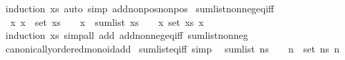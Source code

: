 \begin{isabellebody}
%
\isadelimproof
%
\endisadelimproof
%
\isatagproof
{}\isamarkupfalse%
\ {\isacharparenleft}{\kern0pt}induction\ xs{\isacharparenright}{\kern0pt}\ {\isacharparenleft}{\kern0pt}auto\ simp{\isacharcolon}{\kern0pt}\ add{\isacharunderscore}{\kern0pt}nonpos{\isacharunderscore}{\kern0pt}nonpos{\isacharparenright}{\kern0pt}%
\endisatagproof
{\isafoldproof}%
%
\isadelimproof
\isanewline
%
\endisadelimproof
\isanewline
{}\isamarkupfalse%
\ sum{\isacharunderscore}{\kern0pt}list{\isacharunderscore}{\kern0pt}nonneg{\isacharunderscore}{\kern0pt}eq{\isacharunderscore}{\kern0pt}{}{\isacharunderscore}{\kern0pt}iff{\isacharcolon}{\kern0pt}\isanewline
\ \ {\isachardoublequoteopen}{\isacharparenleft}{\kern0pt}{\isasymAnd}x{\isachardot}{\kern0pt}\ x\ {\isasymin}\ set\ xs\ {\isasymLongrightarrow}\ {}\ {\isasymle}\ x{\isacharparenright}{\kern0pt}\ {\isasymLongrightarrow}\ sum{\isacharunderscore}{\kern0pt}list\ xs\ {\isacharequal}{\kern0pt}\ {}\ {\isasymlongleftrightarrow}\ {\isacharparenleft}{\kern0pt}{\isasymforall}x{\isasymin}\ set\ xs{\isachardot}{\kern0pt}\ x\ {\isacharequal}{\kern0pt}\ {}{\isacharparenright}{\kern0pt}{\isachardoublequoteclose}\isanewline
%
\isadelimproof
%
\endisadelimproof
%
\isatagproof
{}\isamarkupfalse%
\ {\isacharparenleft}{\kern0pt}induction\ xs{\isacharparenright}{\kern0pt}\ {\isacharparenleft}{\kern0pt}simp{\isacharunderscore}{\kern0pt}all\ add{\isacharcolon}{\kern0pt}\ add{\isacharunderscore}{\kern0pt}nonneg{\isacharunderscore}{\kern0pt}eq{\isacharunderscore}{\kern0pt}{}{\isacharunderscore}{\kern0pt}iff\ sum{\isacharunderscore}{\kern0pt}list{\isacharunderscore}{\kern0pt}nonneg{\isacharparenright}{\kern0pt}%
\endisatagproof
{\isafoldproof}%
%
\isadelimproof
\isanewline
%
\endisadelimproof
\isanewline
{}\isamarkupfalse%
\isanewline
\isanewline
{}\isamarkupfalse%
\ canonically{\isacharunderscore}{\kern0pt}ordered{\isacharunderscore}{\kern0pt}monoid{\isacharunderscore}{\kern0pt}add\isanewline
{}\isanewline
\isanewline
{}\isamarkupfalse%
\ sum{\isacharunderscore}{\kern0pt}list{\isacharunderscore}{\kern0pt}eq{\isacharunderscore}{\kern0pt}{}{\isacharunderscore}{\kern0pt}iff\ {\isacharbrackleft}{\kern0pt}simp{\isacharbrackright}{\kern0pt}{\isacharcolon}{\kern0pt}\isanewline
\ \ {\isachardoublequoteopen}sum{\isacharunderscore}{\kern0pt}list\ ns\ {\isacharequal}{\kern0pt}\ {}\ {\isasymlongleftrightarrow}\ {\isacharparenleft}{\kern0pt}{\isasymforall}n\ {\isasymin}\ set\ ns{\isachardot}{\kern0pt}\ n\ {\isacharequal}{\kern0pt}\ {}{\isacharparenright}{\kern0pt}{\isachardoublequoteclose}\isanewline

\end{isabellebody}
